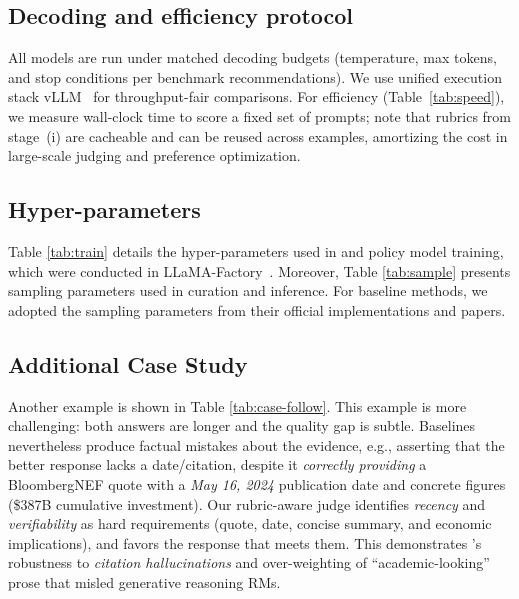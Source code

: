 \subsection{Decoding and efficiency protocol}
All models are run under matched decoding budgets (temperature, max tokens, and stop conditions per benchmark recommendations). We use unified execution stack vLLM~\citep{kwon2023efficient} for throughput-fair comparisons. For efficiency (Table~\ref{tab:speed}), we measure wall-clock time to score a fixed set of prompts; note that rubrics from stage~(i) are cacheable and can be reused across examples, amortizing the cost in large-scale judging and preference optimization.






\subsection{Hyper-parameters}
\label{app:hparams}


Table \ref{tab:train} details the hyper-parameters used in {\name} and policy model training, which were conducted in LLaMA-Factory~\citep{zheng2024llamafactory}. 
Moreover, 
Table \ref{tab:sample} presents sampling parameters used in {\dataset} curation and {\name} inference. 
For baseline methods, we adopted the sampling parameters from their official implementations and papers.  




\subsection{Additional Case Study}
\label{app:case}
Another example is shown in Table \ref{tab:case-follow}. This example is more challenging: both answers are longer and the quality gap is
subtle. Baselines nevertheless produce factual mistakes about the evidence, e.g.,
asserting that the better response lacks a date/citation, despite it
\emph{correctly providing} a BloombergNEF quote with a \emph{May 16, 2024}
publication date and concrete figures (\$387B cumulative investment). Our
rubric-aware judge identifies \emph{recency} and \emph{verifiability} as
hard requirements (quote, date, concise summary, and economic implications),
and favors the response that meets them. This demonstrates {\name}'s robustness
to \emph{citation hallucinations} and over-weighting of “academic-looking”
prose that misled generative reasoning RMs.


